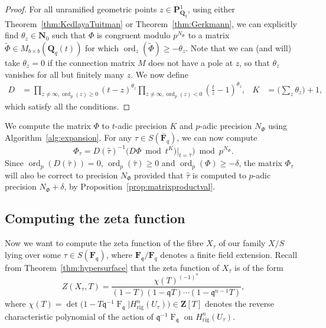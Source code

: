 \documentclass[a4paper,11pt]{article}
\numberwithin{equation}{section}
\newcommand{\NN}{\mathbf{N}} %
\newcommand{\ZZ}{\mathbf{Z}} %
\newcommand{\QQ}{\mathbf{Q}} %
\newcommand{\FF}{\mathbf{F}} %
\DeclareMathOperator{\ord}{ord}          %
\DeclareMathOperator{\Frob}{F}           %
\providecommand{\Hrig}{H_{\text{rig}}}  %
\theoremstyle{definition}
\begin{document}
\begin{proof}
For all unramified geometric points
$z \in \mathbf{P}^1_{\QQ_q}$, using either Theorem~\ref{thm:KedlayaTuitman} 
or Theorem~\ref{thm:Gerkmann}, we can explicitly find $\theta_{z} \in \NN_0$ 
such that $\Phi$ is congruent modulo $p^{N_{\Phi}}$ to a matrix 
$\tilde{\Phi} \in M_{b \times b}(\QQ_q(t))$ for which
$\ord_z(\tilde{\Phi}) \geq -\theta_z$.
Note that we can (and will) take $\theta_z=0$ if the connection matrix $M$ does not have 
a pole at $z$, so that $\theta_z$ vanishes for all but finitely many $z$. We now define 
\begin{align*}
D &= \prod_{z \neq \infty, \ord_p(z) \geq 0} (t-z)^{\theta_z}
    \prod_{z \neq \infty, \ord_p(z) < 0}(\frac{t}{z}-1)^{\theta_z}, 
&K&= \bigl(\sum_{z} \theta_z \bigr) +1,
\end{align*}
which satisfy all the conditions.
\end{proof}

We compute the matrix $\Phi$ to $t$-adic precision $K$ and $p$-adic
precision $N_{\Phi}$ using Algorithm~\ref{alg:expansion}. For any 
$\tau \in S(\bar{\FF}_q)$, we can now compute
\begin{equation*}
\Phi_{\tau} = D(\hat{\tau})^{-1}  \bigl( D \Phi \bmod{t^{K}} \bigr)|_{t=\hat{\tau}} \bigr) \bmod{p^{N_{\Phi}}}.
\end{equation*}
Since $\ord_p(D(\hat{\tau}))=0$, $\ord_p(\hat{\tau}) \geq 0$ and
$\ord_p(\Phi) \geq -\delta$, 
the matrix $\Phi_{\tau}$ will also be correct to precision $N_{\Phi}$ 
provided that $\hat{\tau}$ is computed to $p$-adic precision $N_{\Phi}+\delta$,
by Proposition~\ref{prop:matrixproductval}.

\subsection{Computing the zeta function}

Now we want to compute the zeta function of the fibre $X_{\tau}$ of
our family $X/S$ lying over some $\tau \in S(\FF_{\mathfrak{q}})$, 
where $\FF_{\mathfrak{q}}/\FF_q$ denotes a finite field extension.  
Recall from Theorem~\ref{thm:hypersurface} 
that the zeta function of $X_{\tau}$ is of the form
\begin{equation*}
Z(X_{\tau},T) = \frac{\chi(T)^{(-1)^n}}{(1 - T) (1 - \mathfrak{q}T) \dotsm (1 - \mathfrak{q}^{n-1}T)},
\end{equation*}
where $\chi(T) = \det \bigl( 1 - T \mathfrak{q}^{-1} \Frob_{\mathfrak{q}} | \Hrig^n(U_{\tau}) \bigr) \in \ZZ[T]$ 
denotes the reverse characteristic polynomial of the action 
of $\mathfrak{q}^{-1} \Frob_{\mathfrak{q}}$ 
on $\Hrig^n(U_{\tau})$.
\end{document}
